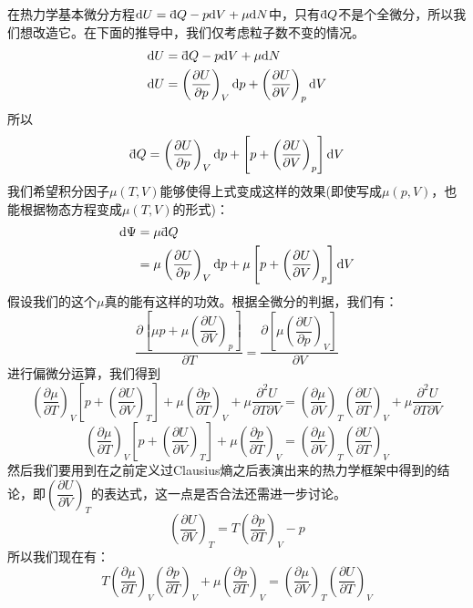 \documentclass[UTF8]{ctexart}
\newcommand{\dbar}{\mathrm{\mathchar'26\mkern-9mu d}}
\newcommand{\md}{\mathrm{d}}
\numberwithin{equation}{subsection}
\begin{document}
在热力学基本微分方程$\md U=\dbar Q-p\md V+\mu\md N$中，只有$\dbar Q$不是个全微分，所以我们想改造它。在下面的推导中，我们仅考虑粒子数不变的情况。
\begin{align*}
\md U&=\dbar Q-p\md V+\mu\md N\\
\md U&=\left(\frac{\partial U}{\partial p}\right)_{V}\md p+\left(\frac{\partial U}{\partial V}\right)_{p}\md V
\end{align*}
所以
\begin{equation*}
\dbar Q=\left(\frac{\partial U}{\partial p}\right)_{V}\md p+\left[p+\left(\frac{\partial U}{\partial V}\right)_{p}\right]\md V
\end{equation*}
我们希望积分因子$\mu(T,V)$能够使得上式变成这样的效果(即使写成$\mu(p,V)$，也能根据物态方程变成$\mu(T,V)$的形式)：
\begin{align*}
\md \Psi&=\mu \dbar Q\\
&=\mu\left(\frac{\partial U}{\partial p}\right)_{V}\md p+\mu\left[p+\left(\frac{\partial U}{\partial V}\right)_{p}\right]\md V
\end{align*}
假设我们的这个$\mu$真的能有这样的功效。根据全微分的判据，我们有：
\[ \frac{\partial\left[\mu p+\mu\left(\dfrac{\partial U}{\partial V}\right)_{p}\right]}{\partial T} = \frac{\partial\left[\mu\left(\dfrac{\partial U}{\partial p}\right)_{V}\right]}{\partial V}\]
进行偏微分运算，我们得到
\begin{equation*}
\left(\frac{\partial \mu}{\partial T}\right)_{V}\left[p+\left(\frac{\partial U}{\partial V}\right)_{T}\right]+\mu\left(\frac{\partial p}{\partial T}\right)_{V}+\mu \frac{\partial^2 U}{\partial T\partial V}=\left(\frac{\partial \mu}{\partial V}\right)_{T}\left(\frac{\partial U}{\partial T}\right)_{V}+\mu \frac{\partial^2 U}{\partial T\partial V}
\end{equation*}
\begin{equation*}
\left(\frac{\partial \mu}{\partial T}\right)_{V}\left[p+\left(\frac{\partial U}{\partial V}\right)_{T}\right]+\mu\left(\frac{\partial p}{\partial T}\right)_{V}=\left(\frac{\partial \mu}{\partial V}\right)_{T}\left(\frac{\partial U}{\partial T}\right)_{V}
\end{equation*}
然后我们要用到在之前定义过Clausius熵之后表演出来的热力学框架中得到的结论，即$\left(\dfrac{\partial U}{\partial V}\right)_{T}$的表达式，这一点是否合法还需进一步讨论。
\begin{equation*}         
\left(\dfrac{\partial U}{\partial V}\right)_{T}=T\left(\dfrac{\partial p}{\partial T}\right)_{V}-p
\end{equation*}
所以我们现在有：
\begin{equation*}
T\left(\frac{\partial \mu}{\partial T}\right)_{V}\left(\frac{\partial p}{\partial T}\right)_{V}+\mu\left(\frac{\partial p}{\partial T}\right)_{V}=\left(\frac{\partial \mu}{\partial V}\right)_{T}\left(\frac{\partial U}{\partial T}\right)_{V}
\end{equation*}
\end{document}
